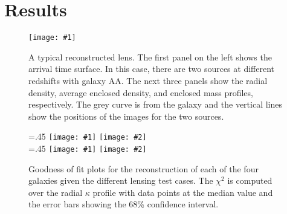 \documentclass[onecolumn,galley]{mn2e}
\newcommand\plotone[1]{%
 \centering
 \leavevmode
 \texttt{[image: \#1]}%
}%
\newcommand\plottwo[2]{{%
 \centering
 \leavevmode
 \columnwidth=.45\columnwidth
 \texttt{[image: \#1]}%
 \hfil
 \texttt{[image: \#2]}%
}}%
\begin{document}
%

\section{Results} %

\begin{figure}
\plotone{AAZContrastR1R5_Tm.pdf}
\caption{A typical reconstructed lens. The first panel on the left shows the
arrival time surface. In this case, there are two sources at different
redshifts with galaxy AA. The next three panels show the radial density,
average enclosed density, and enclosed mass profiles, respectively.  The grey
curve is from the galaxy and the vertical lines show the positions of the
images for the two sources.}
\end{figure}

\begin{figure}
\label{chi2}
\plottwo{AAchi2_profile.pdf}{AAchi2_profile.pdf} \\
\plottwo{BBchi2_profile.pdf}{BCchi2_profile.pdf}
\caption{
Goodness of fit plots for the reconstruction of each of the four galaxies given
the different lensing test cases. The $\chi^2$ is computed over the radial $\kappa$
profile with data points at the median value and the error bars showing the 68\% confidence
interval.
}
\end{figure}
\end{document}
